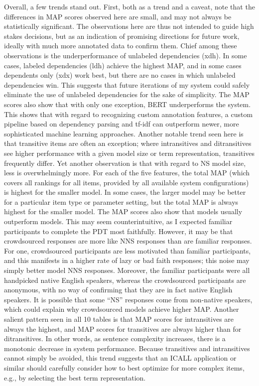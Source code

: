 Overall, a few trends stand out. First, both as a trend and a caveat, note that the differences in MAP scores observed here are small, and may not always be statistically significant.
The observations here are thus not intended to guide high stakes decisions, but as an indication of promising directions for future work, ideally with much more annotated data to confirm them.  Chief among these observations is the underperformance of unlabeled dependencies (xdh). In some cases, labeled dependencies (ldh) achieve the highest MAP, and in some cases dependents only (xdx) work best, but there are no cases in which unlabeled dependencies win. This suggests that future iterations of my system could safely eliminate the use of unlabeled dependencies for the sake of simplicity. The MAP scores also show that with only one exception, BERT underperforms the system. 
This shows that with regard to recognizing custom annotation features, a custom pipeline based on dependency parsing and tf-idf can outperform newer, more sophisticated machine learning approaches.  Another notable trend seen here is that transitive items are often an exception; where intransitives and ditransitives see higher performance with a given model size or term representation, transitives frequently differ. Yet another observation is that with regard to NS model size, less is overwhelmingly more. For each of the five features, the total MAP (which covers all rankings for all items, provided by all available system configurations) is highest for the smaller model. In some cases, the larger model may be better for a particular item type or parameter setting, but the total MAP is always highest for the smaller model. The MAP scores also show that  models usually outperform  models. This may seem counterintuitive, as I expected familiar participants to complete the PDT most faithfully. However, it may be that crowdsourced responses are more like NNS responses than are familiar responses. For one, crowdsourced participants are less motivated than familiar participants, and this manifests in a higher rate of lazy or bad faith responses; this noise may simply better model NNS responses. Moreover, the familiar participants were all handpicked native English speakers, whereas the crowdsourced participants are anonymous, with no way of confirming that they are in fact native English speakers. It is possible that some ``NS'' responses come from non-native speakers, which could explain why crowdsourced models achieve higher MAP.
Another salient pattern seen in all 10 tables is that MAP scores for intransitives are always the highest, and MAP scores for transitives are always higher than for ditransitives. In other words, as sentence complexity increases, there is a monotonic decrease in system performance. Because transitives and intransitives cannot simply be avoided, this trend suggests that an ICALL application or similar should carefully consider how to best optimize for more complex items, e.g., by selecting the best term representation.

